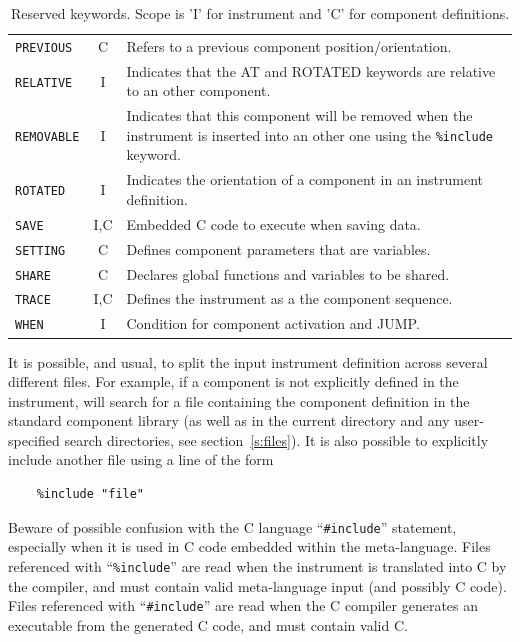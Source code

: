 \begin{table}
\begin{center}
{\begin{tabular}{|l|c|p{}|}
      \texttt{PREVIOUS} & C & Refers to a previous component position/orientation.\\
      \texttt{RELATIVE} & I & Indicates that the AT and ROTATED keywords are relative to an other component. \\
      \texttt{REMOVABLE} & I & Indicates that this component will be removed when the instrument is inserted into an other one using the \texttt{\%include} keyword. \\
      \texttt{ROTATED} & I & Indicates the orientation of a component in an instrument definition. \\
      \texttt{SAVE} & I,C & Embedded C code to execute when saving data. \\
      \texttt{SETTING} & C & Defines component parameters that are
      variables. \\
      \texttt{SHARE} & C & Declares global functions and variables to be shared. \\
      \texttt{TRACE} & I,C & Defines the instrument as a the component sequence. \\
      \texttt{WHEN}  & I & Condition for component activation and JUMP.\\
      \hline
    \end{tabular}
    \caption{Reserved \MCS keywords.
    Scope is 'I' for instrument and 'C' for component definitions.
    }
    \label{t:keywords}
    }
  \end{center}
\end{table}

It is possible, and usual, to split the input instrument definition
across several different files. For example, if a component is not
explicitly defined in the instrument,
\MCS will search for a file containing the component definition in the
standard component library (as well as in the current directory and any
user-specified search directories, see section~\ref{s:files}). It is
also possible to explicitly include another file using a line of the
form 
\begin{lstlisting}
    %include "file"
\end{lstlisting}
Beware of possible confusion with the C language ``\verb+#include+''
statement, especially when it is used in C code embedded within the
\MCS meta-language. Files referenced with ``\verb+%include+'' are read
when the instrument is translated into C by the \MCS compiler, and must
contain valid \MCS meta-language input (and possibly C code). Files referenced with
``\verb+#include+'' are read when the C compiler generates an
executable from the generated C code, and must contain valid C.

